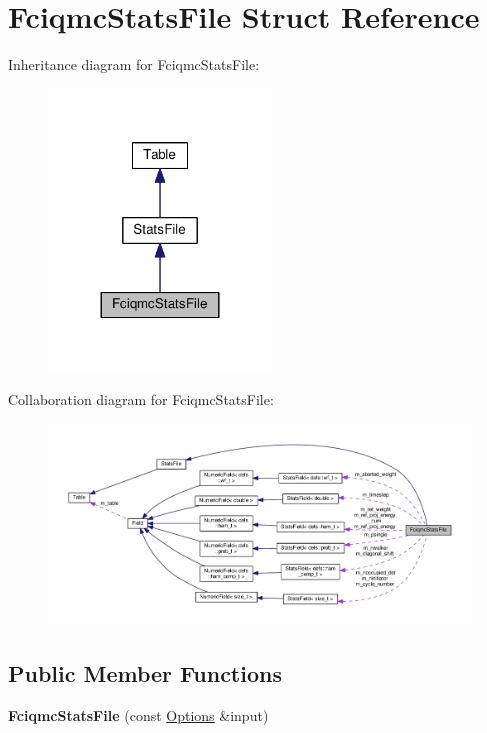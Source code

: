\hypertarget{structFciqmcStatsFile}{}\section{Fciqmc\+Stats\+File Struct Reference}
\label{structFciqmcStatsFile}


Inheritance diagram for Fciqmc\+Stats\+File\+:\nopagebreak
\begin{figure}[H]
\begin{center}
\leavevmode
\includegraphics[width=168pt]{structFciqmcStatsFile__inherit__graph}
\end{center}
\end{figure}


Collaboration diagram for Fciqmc\+Stats\+File\+:\nopagebreak
\begin{figure}[H]
\begin{center}
\leavevmode
\includegraphics[width=350pt]{structFciqmcStatsFile__coll__graph}
\end{center}
\end{figure}
\subsection*{Public Member Functions}
\begin{DoxyCompactItemize}
\item 
{\bfseries Fciqmc\+Stats\+File} (const \hyperlink{structOptions}{Options} \&input)\hypertarget{structFciqmcStatsFile_a077b949e882f2e2d560ef642f2c355bf}{}\label{structFciqmcStatsFile_a077b949e882f2e2d560ef642f2c355bf}

\end{DoxyCompactItemize}
